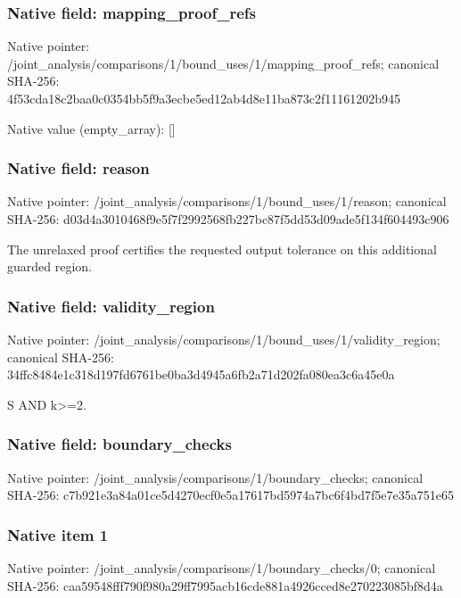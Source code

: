 \documentclass[10pt,a4paper]{article}
\begin{document}
\subsubsection{Native field: mapping\_\allowbreak{}proof\_\allowbreak{}refs}
Native pointer: /joint\_\allowbreak{}analysis/comparisons/1/bound\_\allowbreak{}uses/1/mapping\_\allowbreak{}proof\_\allowbreak{}refs; canonical SHA-256: 4f53cda18c2baa0c0354bb5f9a3ecbe5ed12ab4d8e11ba873c2f11161202b945

Native value (empty\_\allowbreak{}array): []

\subsubsection{Native field: reason}
Native pointer: /joint\_\allowbreak{}analysis/comparisons/1/bound\_\allowbreak{}uses/1/reason; canonical SHA-256: d03d4a3010468f9e5f7f2992568fb227bc87f5dd53d09ade5f134f604493c906

\begingroup\raggedright\sloppy The unrelaxed proof certifies the requested output tolerance on this additional guarded region.\par\endgroup

\subsubsection{Native field: validity\_\allowbreak{}region}
Native pointer: /joint\_\allowbreak{}analysis/comparisons/1/bound\_\allowbreak{}uses/1/validity\_\allowbreak{}region; canonical SHA-256: 34ffc8484e1c318d197fd6761be0ba3d4945a6fb2a71d202fa080ea3c6a45e0a

\begingroup\raggedright\sloppy S AND k>=\allowbreak{}2.\par\endgroup

\subsubsection{Native field: boundary\_\allowbreak{}checks}
Native pointer: /joint\_\allowbreak{}analysis/comparisons/1/boundary\_\allowbreak{}checks; canonical SHA-256: c7b921e3a84a01ce5d4270ecf0e5a17617bd5974a7bc6f4bd7f5e7e35a751e65

\subsubsection{Native item 1}
Native pointer: /joint\_\allowbreak{}analysis/comparisons/1/boundary\_\allowbreak{}checks/0; canonical SHA-256: caa59548fff790f980a29ff7995acb16cde881a4926cced8e270223085bf8d4a
\end{document}
